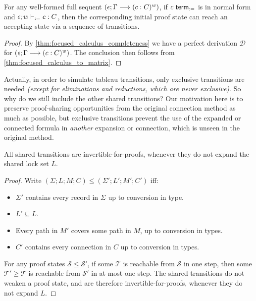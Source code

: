 \documentclass[twoside]{report}
\begin{document}
\begin{proposition}[Completeness]
\label{thm:matrix_completeness}
For any well-formed full sequent $(\epsilon; \Gamma \longrightarrow (c : C)^w)$, if $c \ \mathsf{term}_{:=}$ is in normal form and $\epsilon; w \vdash_{:=} c : C$, then the corresponding initial proof state can reach an accepting state via a sequence of transitions.
\end{proposition}

\begin{proof}
By \cref{thm:focused_calculus_completeness} we have a perfect derivation $\mathcal D$ for $(\epsilon; \Gamma \longrightarrow (c : C)^w)$. The conclusion then follows from \cref{thm:focused_calculus_to_matrix}.
\end{proof}

Actually, in order to simulate tableau transitions, only exclusive transitions are needed \emph{(except for eliminations and reductions, which are never exclusive)}. So why do we still include the other shared transitions? Our motivation here is to preserve proof-sharing opportunities from the original connection method \cite{wallen1987automated} as much as possible, but exclusive transitions prevent the use of the expanded or connected formula in \emph{another} expansion or connection, which is unseen in the original method.

\begin{proposition}
\label{thm:matrix_transitions_invertibility}
All shared transitions are invertible-for-proofs, whenever they do not expand the shared lock set $L$.
\end{proposition}

\begin{proof}
Write $(\Sigma; L; M; C) \leq (\Sigma'; L'; M'; C')$ iff:
\begin{itemize}[noitemsep]
    \item $\Sigma'$ contains every record in $\Sigma$ up to conversion in type.
    \item $L' \subseteq L$.
    \item Every path in $M'$ covers some path in $M$, up to conversion in types.
    \item $C'$ contains every connection in $C$ up to conversion in types.
\end{itemize}

For any proof states $\mathcal S \leq \mathcal S'$, if some $\mathcal T$ is reachable from $\mathcal S$ in one step, then some $\mathcal T' \geq \mathcal T$ is reachable from $\mathcal S'$ in at most one step. The shared transitions do not weaken a proof state, and are therefore invertible-for-proofs, whenever they do not expand $L$.
\end{proof}
\end{document}
